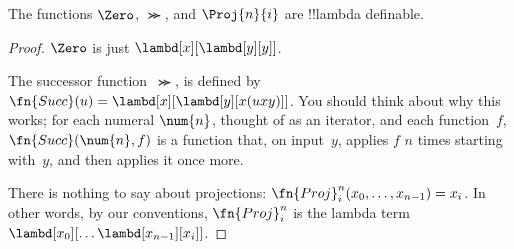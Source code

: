 \documentclass[../../../include/open-logic-section]{subfiles}
\begin{document}

\begin{lem}
The functions $\Zero$, $\Succ$, and $\Proj{n}{i}$ are !!{lambda definable}.
\end{lem}

\begin{proof}
$\Zero$ is just
$\lambd[x][\lambd[y][y]]$.

The successor function~$\Succ$, is
defined by $\fn{Succ}(u) = \lambd[x][\lambd[y][x(uxy)]]$. You should
think about why this works; for each numeral $\num{n}$, thought of as
an iterator, and each function~$f$, $\fn{Succ}(\num{n},f)$ is a function that,
on input~$y$, applies $f$ $n$ times starting with~$y$, and then
applies it once more.

There is nothing to say about projections: $\fn{Proj}^n_i(x_0, \dots,
x_{n-1}) = x_i$. In other words, by our conventions, $\fn{Proj}^n_i$ is
the lambda term $\lambd[x_0][\dots \lambd[x_{n-1}][x_i]]$.
\end{proof}
\end{document}
